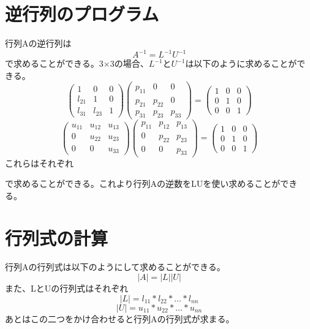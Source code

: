 \documentclass{jsarticle}
\begin{document}
\section{逆行列のプログラム}
行列Aの逆行列は
\[
A^{-1}=L^{-1}U^{-1}
\]
で求めることができる。3$\times$3の場合、$L^{-1}$と$U^{-1}$は以下のように求めることができる。
 \[
 \left(
  \begin{array}{ccc}
      1 & 0 & 0 \\
      l_{21} & 1 & 0 \\
      l_{31} & l_{23} & 1
     \end{array}
  \right)
  \left(
  \begin{array}{ccc}
      p_{11} & 0 & 0 \\
      p_{21} & p_{22} & 0 \\
      p_{31} & p_{23} & p_{33}
     \end{array}
  \right)=
  \left(
  \begin{array}{ccc}
      1 & 0 & 0 \\
      0 & 1 & 0 \\
      0 & 0 & 1
     \end{array}
  \right)
  \]
\[
\left(
    \begin{array}{ccc}
      u_{11} & u_{12} & u_{13} \\
      0 & u_{22} & u_{23} \\
      0 & 0 & u_{33}
     \end{array}
  \right)
  \left(
    \begin{array}{ccc}
      p_{11} & p_{12} & p_{13} \\
      0 & p_{22} & p_{23} \\
      0 & 0  & p_{33}
     \end{array}
  \right)=
  \left(
  \begin{array}{ccc}
      1 & 0 & 0 \\
      0 & 1 & 0 \\
      0 & 0 & 1
     \end{array}
  \right)
  \]
これらはそれぞれ


で求めることができる。これより行列Aの逆数をLUを使い求めることができる。
\section{行列式の計算}
行列Aの行列式は以下のようにして求めることができる。
\[
|A|=|L||U|
\]
また、LとUの行列式はそれぞれ
\[
|L|=l_{11}*l_{22}*\ldots*l_{nn}
\]
\[
|U|=u_{11}*u_{22}*\ldots*u_{nn}
\]
あとはこの二つをかけ合わせると行列Aの行列式が求まる。
\end{document}
